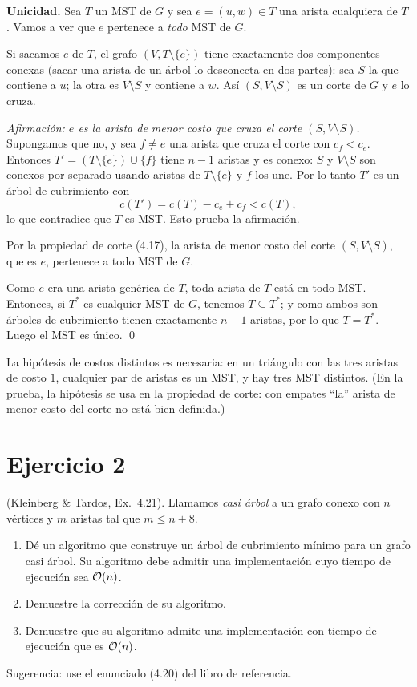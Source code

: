 \textbf{Unicidad.} Sea $T$ un MST de $G$ y sea $e=(u,w)\in T$ una arista cualquiera de $T$. Vamos a ver que $e$ pertenece a \emph{todo} MST de $G$.

Si sacamos $e$ de $T$, el grafo $(V,T\setminus\{e\})$ tiene exactamente dos componentes conexas (sacar una arista de un árbol lo desconecta en dos partes): sea $S$ la que contiene a $u$; la otra es $V\setminus S$ y contiene a $w$. Así $(S,V\setminus S)$ es un corte de $G$ y $e$ lo cruza.

\emph{Afirmación: $e$ es la arista de menor costo que cruza el corte $(S,V\setminus S)$.} Supongamos que no, y sea $f\neq e$ una arista que cruza el corte con $c_f<c_e$. Entonces $T'=(T\setminus\{e\})\cup\{f\}$ tiene $n-1$ aristas y es conexo: $S$ y $V\setminus S$ son conexos por separado usando aristas de $T\setminus\{e\}$ y $f$ los une. Por lo tanto $T'$ es un árbol de cubrimiento con
\[ c(T') = c(T) - c_e + c_f < c(T), \]
lo que contradice que $T$ es MST. Esto prueba la afirmación.

Por la propiedad de corte (4.17), la arista de menor costo del corte $(S,V\setminus S)$, que es $e$, pertenece a todo MST de $G$.

Como $e$ era una arista genérica de $T$, toda arista de $T$ está en todo MST. Entonces, si $T^\ast$ es cualquier MST de $G$, tenemos $T\subseteq T^\ast$; y como ambos son árboles de cubrimiento tienen exactamente $n-1$ aristas, por lo que $T=T^\ast$. Luego el MST es único. \qed

\begin{observacion}
La hipótesis de costos distintos es necesaria: en un triángulo con las tres aristas de costo $1$, cualquier par de aristas es un MST, y hay tres MST distintos. (En la prueba, la hipótesis se usa en la propiedad de corte: con empates ``la'' arista de menor costo del corte no está bien definida.)
\end{observacion}

\section{Ejercicio 2}
\begin{enunciado}
(Kleinberg \& Tardos, Ex.~4.21). Llamamos \emph{casi árbol} a un grafo conexo con $n$ vértices y $m$ aristas tal que $m\le n+8$.
\begin{enumerate}[label=(\alph*)]
\item Dé un algoritmo que construye un árbol de cubrimiento mínimo para un grafo casi árbol. Su algoritmo debe admitir una implementación cuyo tiempo de ejecución sea $\mathcal{O}(n)$.
\item Demuestre la corrección de su algoritmo.
\item Demuestre que su algoritmo admite una implementación con tiempo de ejecución que es $\mathcal{O}(n)$.
\end{enumerate}
Sugerencia: use el enunciado (4.20) del libro de referencia.
\end{enunciado}

